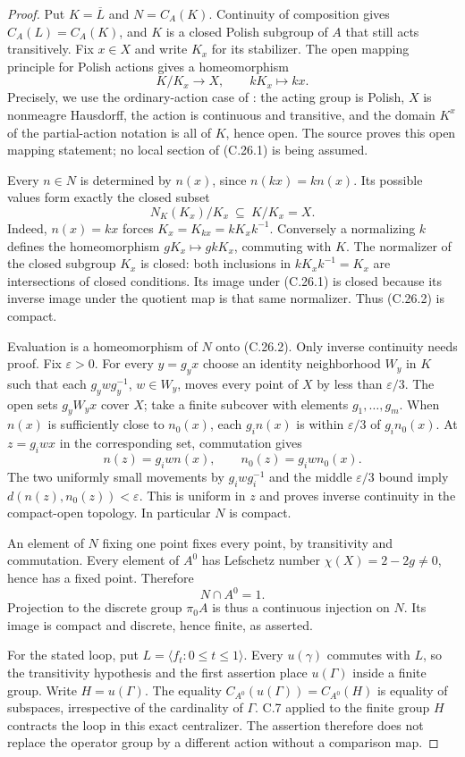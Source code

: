 \begin{proof}
Put $K=\overline L$ and $N=C_A(K)$. Continuity of composition gives
$C_A(L)=C_A(K)$, and $K$ is a closed Polish subgroup of $A$ that
still acts transitively. Fix $x\in X$ and write $K_x$ for its stabilizer.
The open mapping principle for Polish actions gives a homeomorphism
\[
 K/K_x\longrightarrow X,\qquad kK_x\longmapsto kx.
                                                        \tag{C.26.1}
\]
Precisely, we use the ordinary-action case of
\cite[Theorem~3.5]{C_GomezPinedoUzcategui2017}: the acting group is
Polish, $X$ is nonmeagre Hausdorff, the action is continuous and
transitive, and the domain $K^x$ of the partial-action notation is all
of $K$, hence open. The source proves this open mapping statement;
no local section of (C.26.1) is being assumed.

Every $n\in N$ is determined by $n(x)$, since
$n(kx)=k n(x)$. Its possible values form exactly the closed subset
\[
 N_K(K_x)/K_x\ \subseteq\ K/K_x=X.                      \tag{C.26.2}
\]
Indeed, $n(x)=kx$ forces $K_x=K_{kx}=kK_xk^{-1}$.
Conversely a normalizing $k$ defines the homeomorphism
$gK_x\mapsto gkK_x$, commuting with $K$. The normalizer of the closed
subgroup $K_x$ is closed: both inclusions in
$kK_xk^{-1}=K_x$ are intersections of closed conditions. Its image
under (C.26.1) is closed because its inverse image under the quotient
map is that same normalizer. Thus (C.26.2) is compact.

Evaluation is a homeomorphism of $N$ onto (C.26.2). Only inverse
continuity needs proof. Fix $\varepsilon>0$. For every $y=g_yx$ choose
an identity neighborhood $W_y$ in $K$ such that each
$g_ywg_y^{-1}$, $w\in W_y$, moves every point of $X$ by less than
$\varepsilon/3$. The open sets $g_yW_yx$ cover $X$; take a finite
subcover with elements $g_1,\ldots,g_m$. When $n(x)$ is sufficiently
close to $n_0(x)$, each $g_i n(x)$ is within $\varepsilon/3$ of
$g_i n_0(x)$. At $z=g_iwx$ in the corresponding set, commutation gives
\[
 n(z)=g_iw n(x),\qquad n_0(z)=g_iw n_0(x).
\]
The two uniformly small movements by $g_iwg_i^{-1}$ and the middle
$\varepsilon/3$ bound imply $d(n(z),n_0(z))<\varepsilon$. This is
uniform in $z$ and proves inverse continuity in the compact-open
topology. In particular $N$ is compact.

An element of $N$ fixing one point fixes every point, by transitivity
and commutation. Every element of $A^0$ has Lefschetz number
$\chi(X)=2-2g\ne0$, hence has a fixed point. Therefore
\[
                       N\cap A^0=1.
\]
Projection to the discrete group $\pi_0A$ is thus a continuous
injection on $N$. Its image is compact and discrete, hence finite,
as asserted.

For the stated loop, put $L=\langle f_t:0\leq t\leq1\rangle$.
Every $u(\gamma)$ commutes with $L$, so the transitivity hypothesis
and the first assertion place $u(\Gamma)$ inside a finite group.
Write $H=u(\Gamma)$. The equality
$C_{A^0}(u(\Gamma))=C_{A^0}(H)$ is equality of subspaces, irrespective
of the cardinality of $\Gamma$. C.7 applied to the finite group $H$
contracts the loop in this exact centralizer. The assertion therefore
does not replace the operator group by a different action without a
comparison map.
\end{proof}

